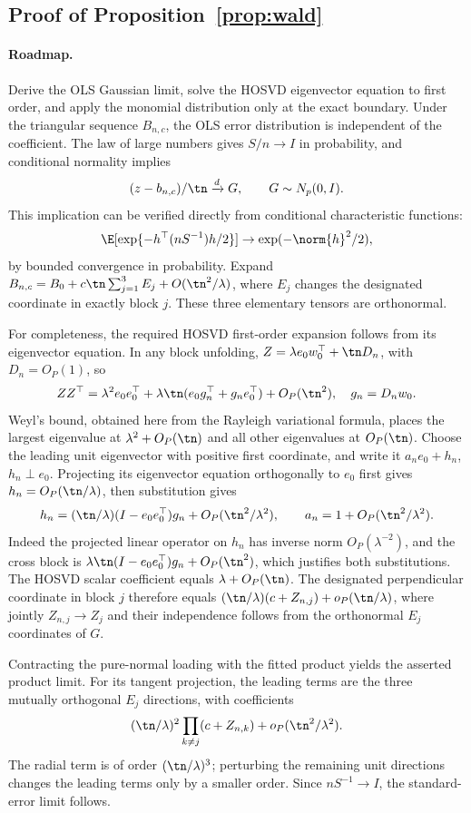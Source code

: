 \subsection{Proof of Proposition~\ref{prop:wald}}
\paragraph{Roadmap.} Derive the OLS Gaussian limit, solve the HOSVD eigenvector equation to first order, and apply the monomial distribution only at the exact boundary.
Under the triangular sequence $B_{n,c}$, the OLS error distribution is independent of the coefficient. The law of large numbers gives $S/n\to I$ in probability, and conditional normality implies
\[
 (z-b_{n,c})/\tn\xrightarrow{d}G,\qquad G\sim N_p(0,I).
\]
This implication can be verified directly from conditional characteristic functions:
\[
 \E[\exp\{-h^\top(nS^{-1})h/2\}]\to\exp(-\norm{h}^2/2),
\]
by bounded convergence in probability. Expand $B_{n,c}=B_0+c\tn\sum_{j=1}^3 E_j+O(\tn^2/\lambda)$, where $E_j$ changes the designated coordinate in exactly block $j$. These three elementary tensors are orthonormal.

For completeness, the required HOSVD first-order expansion follows from its eigenvector equation. In any block unfolding, $Z=\lambda e_0w_0^\top+\tn D_n$, with $D_n=O_P(1)$, so
\[
 ZZ^\top=\lambda^2e_0e_0^\top+
 \lambda\tn(e_0g_n^\top+g_ne_0^\top)+O_P(\tn^2),\quad g_n=D_nw_0.
\]
Weyl's bound, obtained here from the Rayleigh variational formula, places the largest eigenvalue at $\lambda^2+O_P(\tn)$ and all other eigenvalues at $O_P(\tn)$. Choose the leading unit eigenvector with positive first coordinate, and write it $a_ne_0+h_n$, $h_n\perp e_0$. Projecting its eigenvector equation orthogonally to $e_0$ first gives $h_n=O_P(\tn/\lambda)$, then substitution gives
\[
 h_n=(\tn/\lambda)(I-e_0e_0^\top)g_n+O_P(\tn^2/\lambda^2),
 \qquad a_n=1+O_P(\tn^2/\lambda^2).
\]
Indeed the projected linear operator on $h_n$ has inverse norm $O_P(\lambda^{-2})$, and the cross block is $\lambda\tn(I-e_0e_0^\top)g_n+O_P(\tn^2)$, which justifies both substitutions. The HOSVD scalar coefficient equals $\lambda+O_P(\tn)$. The designated perpendicular coordinate in block $j$ therefore equals $(\tn/\lambda)(c+Z_{n,j})+o_P(\tn/\lambda)$, where jointly $Z_{n,j}\to Z_j$ and their independence follows from the orthonormal $E_j$ coordinates of $G$.

Contracting the pure-normal loading with the fitted product yields the asserted product limit. For its tangent projection, the leading terms are the three mutually orthogonal $E_j$ directions, with coefficients
\[
 (\tn/\lambda)^2\prod_{k\ne j}(c+Z_{n,k})+o_P(\tn^2/\lambda^2).
\]
The radial term is of order $(\tn/\lambda)^3$; perturbing the remaining unit directions changes the leading terms only by a smaller order. Since $nS^{-1}\to I$, the standard-error limit follows.

